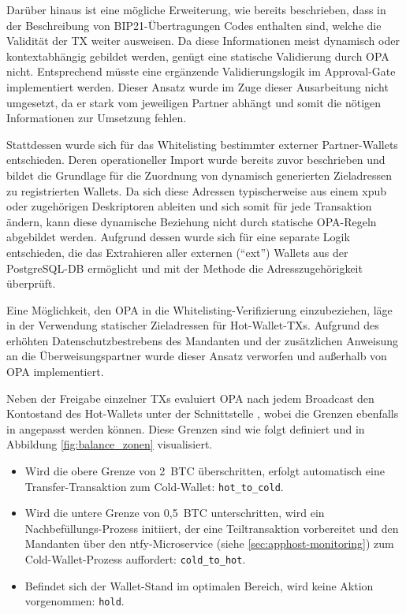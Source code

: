 Darüber hinaus ist eine mögliche Erweiterung, wie bereits beschrieben, dass in der Beschreibung von \ac{BIP}21-Übertragungen Codes enthalten sind, welche die Validität der \ac{TX} weiter ausweisen. Da diese Informationen meist dynamisch oder kontextabhängig gebildet werden, genügt eine statische Validierung durch \ac{OPA} nicht. Entsprechend müsste eine ergänzende Validierungslogik im Approval-Gate implementiert werden. Dieser Ansatz wurde im Zuge dieser Ausarbeitung nicht umgesetzt, da er stark vom jeweiligen Partner abhängt und somit die nötigen Informationen zur Umsetzung fehlen.

Stattdessen wurde sich für das Whitelisting bestimmter externer Partner-Wallets entschieden. Deren operationeller Import wurde bereits zuvor beschrieben und bildet die Grundlage für die Zuordnung von dynamisch generierten Zieladressen zu registrierten Wallets.
Da sich diese Adressen typischerweise aus einem \ac{xpub} oder zugehörigen Deskriptoren ableiten und sich somit für jede Transaktion ändern, kann diese dynamische Beziehung nicht durch statische \ac{OPA}-Regeln abgebildet werden.
Aufgrund dessen wurde sich für eine separate Logik entschieden, die das Extrahieren aller externen (\enquote{ext}) Wallets aus der PostgreSQL-\ac{DB} ermöglicht und mit der Methode  die Adresszugehörigkeit überprüft.

Eine Möglichkeit, den \ac{OPA} in die Whitelisting-Verifizierung einzubeziehen, läge in der Verwendung statischer Zieladressen für Hot-Wallet-\acp{TX}. Aufgrund des erhöhten Datenschutzbestrebens des Mandanten und der zusätzlichen Anweisung an die Überweisungspartner wurde dieser Ansatz verworfen und außerhalb von \ac{OPA} implementiert.

Neben der Freigabe einzelner \acp{TX} evaluiert \ac{OPA} nach jedem Broadcast den Kontostand des Hot-Wallets unter der Schnittstelle , wobei die Grenzen ebenfalls in  angepasst werden können. Diese Grenzen sind wie folgt definiert und in Abbildung \ref{fig:balance_zonen} visualisiert.
\begin{itemize}
    \item Wird die obere Grenze von 2~\ac{BTC} überschritten, erfolgt automatisch eine Transfer-Transaktion zum Cold-Wallet: \texttt{hot\_to\_cold}.
    \item Wird die untere Grenze von 0,5~\ac{BTC} unterschritten, wird ein Nachbefüllungs-Prozess initiiert, der eine Teiltransaktion vorbereitet und den Mandanten über den ntfy-Microservice (siehe \ref{sec:apphost-monitoring}) zum Cold-Wallet-Prozess auffordert: \texttt{cold\_to\_hot}.
    \item Befindet sich der Wallet-Stand im optimalen Bereich, wird keine Aktion vorgenommen: \texttt{hold}.
\end{itemize}

